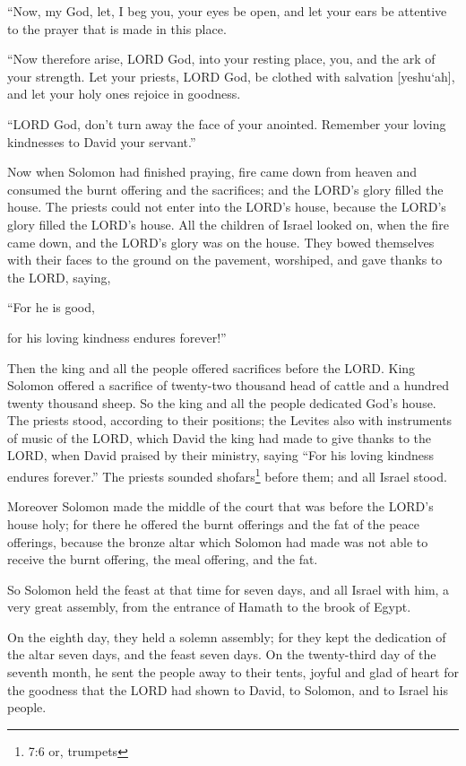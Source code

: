\myverse{}“Now, my God, let, I beg you, your eyes be open, and let your
ears be attentive to the prayer that is made in this place.

\myverse{}“Now therefore arise, LORD God, into your resting place, you,
and the ark of your strength. Let your priests, LORD God, be clothed with salvation [yeshu`ah], and let
your holy ones rejoice in goodness.

\myverse{}“LORD God, don’t turn away the face of your anointed. Remember
your loving kindnesses to David your servant.”


\mychapter{} \myverse*{}Now when Solomon had finished praying, fire came down from heaven
and consumed the burnt offering and the sacrifices; and the LORD’s glory filled the house.
\myverse{}The priests could not enter into the LORD’s house, because the LORD’s glory
filled the LORD’s house.
\myverse{}All the children of Israel looked on, when the fire came down, and the LORD’s
glory was on the house. They bowed themselves with their faces to the ground on the pavement, worshiped,
and gave thanks to the LORD, saying,

“For he is good,

for his loving kindness endures forever!”

\myverse{}Then the king and all the people offered sacrifices before the
LORD.
\myverse{}King Solomon offered a sacrifice of twenty-two thousand head of cattle and a
hundred twenty thousand sheep. So the king and all the people dedicated God’s house.
\myverse{}The priests stood, according to their positions; the Levites also with instruments
of music of the LORD, which David the king had made to give thanks to the LORD, when David praised by
their ministry, saying “For his loving kindness endures forever.” The priests sounded shofars\footnote{7:6 or, trumpets}
before them; and all Israel stood.

\myverse{}Moreover Solomon made the middle of the court that was before the
LORD’s house holy; for there he offered the burnt offerings and the fat of the peace offerings, because
the bronze altar which Solomon had made was not able to receive the burnt offering, the meal offering,
and the fat.

\myverse{}So Solomon held the feast at that time for seven days, and all
Israel with him, a very great assembly, from the entrance of Hamath to the brook of Egypt.

\myverse{}On the eighth day, they held a solemn assembly; for they kept the
dedication of the altar seven days, and the feast seven days.
\myverse{}On the twenty-third day of the seventh month, he sent the people away to their
tents, joyful and glad of heart for the goodness that the LORD had shown to David, to Solomon, and to
Israel his people.

